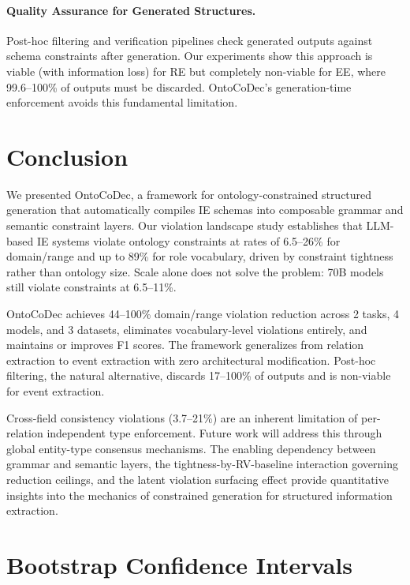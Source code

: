 \documentclass[11pt,a4paper]{article}
\newcommand{\ours}{OntoCoDec}
\begin{document}
\paragraph{Quality Assurance for Generated Structures.}
Post-hoc filtering and verification pipelines check generated outputs against schema constraints after generation. Our experiments show this approach is viable (with information loss) for RE but completely non-viable for EE, where 99.6--100\% of outputs must be discarded. \ours{}'s generation-time enforcement avoids this fundamental limitation.

\section{Conclusion}

We presented \ours{}, a framework for ontology-constrained structured generation that automatically compiles IE schemas into composable grammar and semantic constraint layers. Our violation landscape study establishes that LLM-based IE systems violate ontology constraints at rates of 6.5--26\% for domain/range and up to 89\% for role vocabulary, driven by constraint tightness rather than ontology size. Scale alone does not solve the problem: 70B models still violate constraints at 6.5--11\%.

\ours{} achieves 44--100\% domain/range violation reduction across 2 tasks, 4 models, and 3 datasets, eliminates vocabulary-level violations entirely, and maintains or improves F1 scores. The framework generalizes from relation extraction to event extraction with zero architectural modification. Post-hoc filtering, the natural alternative, discards 17--100\% of outputs and is non-viable for event extraction.

Cross-field consistency violations (3.7--21\%) are an inherent limitation of per-relation independent type enforcement. Future work will address this through global entity-type consensus mechanisms. The enabling dependency between grammar and semantic layers, the tightness-by-RV-baseline interaction governing reduction ceilings, and the latent violation surfacing effect provide quantitative insights into the mechanics of constrained generation for structured information extraction.

\appendix

\section{Bootstrap Confidence Intervals}
\label{app:bootstrap}
\end{document}
